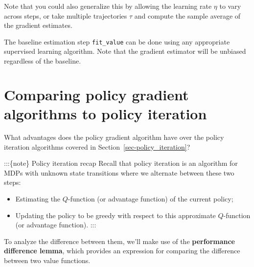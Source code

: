 \documentclass[
  letterpaper,
  DIV=11,
  numbers=noendperiod]{scrreprt}
\providecommand{\tightlist}{%
  \setlength{\itemsep}{0pt}\setlength{\parskip}{0pt}}\usepackage{longtable,booktabs,array}
\theoremstyle{plain}
\theoremstyle{plain}
\theoremstyle{definition}
\theoremstyle{definition}
\theoremstyle{remark}
\begin{document}
Note that you could also generalize this by allowing the learning rate
\(\eta\) to vary across steps, or take multiple trajectories \(\tau\)
and compute the sample average of the gradient estimates.

The baseline estimation step \texttt{fit\_value} can be done using any
appropriate supervised learning algorithm. Note that the gradient
estimator will be unbiased regardless of the baseline.

\section{Comparing policy gradient algorithms to policy
iteration}\label{comparing-policy-gradient-algorithms-to-policy-iteration}

What advantages does the policy gradient algorithm have over the policy
iteration algorithms covered in Section~\ref{sec-policy_iteration}?

:::\{note\} Policy iteration recap Recall that policy iteration is an
algorithm for MDPs with unknown state transitions where we alternate
between these two steps:

\begin{itemize}
\tightlist
\item
  Estimating the \(Q\)-function (or advantage function) of the current
  policy;
\item
  Updating the policy to be greedy with respect to this approximate
  \(Q\)-function (or advantage function). :::
\end{itemize}

To analyze the difference between them, we'll make use of the
\textbf{performance difference lemma}, which provides an expression for
comparing the difference between two value functions.
\end{document}
